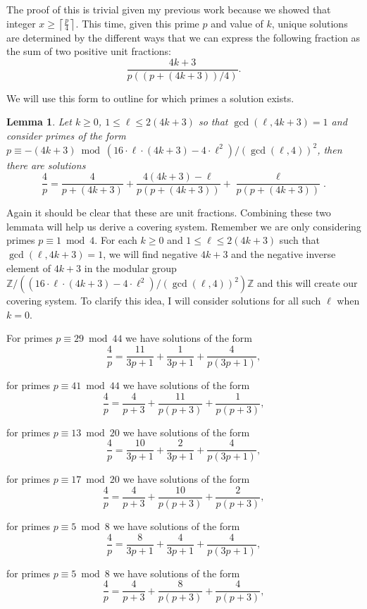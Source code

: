 \documentclass[10pt]{article}
\newtheorem{lemma}{Lemma}
\theoremstyle{definition}
\begin{document}
The proof of this is trivial given my previous work because we showed that integer $x \geq \left\lceil \frac{p}{4} \right\rceil$. This time, given this prime $p$  and value of $k$,  unique solutions are determined by the different ways that we can express the following fraction as the sum of two positive unit fractions:  $$ \frac{4k+3}{p\left( (p+(4k+3)) \slash 4 \right)}. $$

We will use this form to outline for which primes a solution exists. 

\begin{lemma}
Let $k \geq 0$, $1 \leq \ell \leq 2(4k+3)$   so that $\gcd(\ell, 4k+3) = 1$  and consider primes of the form $p \equiv  -(4k+3) \bmod (16 \cdot \ell \cdot (4k+3) - 4 \cdot \ell^{2}) \slash (\gcd(\ell,4))^{2}$, then there are solutions $$ \frac{4}{p} = \frac{4}{p+(4k+3)}  + \frac{4(4k+3) - \ell}{p(p+(4k+3))} + \frac{\ell}{p(p+(4k+3))}.$$
\end{lemma}

Again it should be clear that these are unit fractions.  Combining these two lemmata will help us derive a covering system.  Remember we are only considering primes $p \equiv 1 \bmod 4$.  For each $k \geq 0$  and $1 \leq \ell \leq 2(4k+3)$  such that $\gcd(\ell, 4k+3)=1$, we will find negative $4k+3$  and the negative inverse element of $4k+3$ in the modular group $\mathbb{Z} \slash ((16 \cdot \ell \cdot (4k+3) - 4 \cdot \ell^{2}) \slash (\gcd(\ell,4))^{2}) \mathbb{Z}$ and this will create our covering system.  To clarify this idea, I will consider solutions for all such $\ell$ when $k=0$.

For primes $p \equiv 29 \bmod 44$  we have solutions of the form $$ \frac{4}{p} = \frac{11}{3p+1} + \frac{1}{3p+1} + \frac{4}{p(3p+1)},$$

\noindent for primes $p \equiv 41 \bmod 44$  we have solutions of the form $$ \frac{4}{p} = \frac{4}{p+3} + \frac{11}{p(p+3)} + \frac{1}{p(p+3)},$$

\noindent for primes $p \equiv 13 \bmod 20$  we have solutions of the form $$ \frac{4}{p} = \frac{10}{3p+1} + \frac{2}{3p+1} + \frac{4}{p(3p+1)},$$

\noindent for primes $p \equiv 17 \bmod 20$  we have solutions of the form $$ \frac{4}{p} = \frac{4}{p+3} + \frac{10}{p(p+3)} + \frac{2}{p(p+3)},$$

\noindent for primes $p \equiv 5 \bmod 8$  we have solutions of the form $$ \frac{4}{p} = \frac{8}{3p+1} + \frac{4}{3p+1} + \frac{4}{p(3p+1)},$$

\noindent for primes $p \equiv 5 \bmod 8$  we have solutions of the form $$ \frac{4}{p} = \frac{4}{p+3} + \frac{8}{p(p+3)} + \frac{4}{p(p+3)},$$
\end{document}

